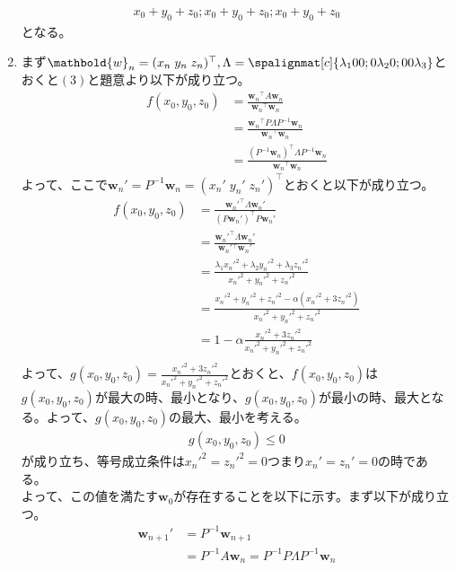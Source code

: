 \documentclass[dvipdfmx,titlepage, 11pt, a4paper]{jsarticle}%
\begin{document}
\begin{enumerate}[(1)]
\begin{align*}
{					{x_0 + y_0 + z_0};
					{x_0 + y_0 + z_0};
					{x_0 + y_0 + z_0}
				}
			\end{align*}
			となる。
	\item まず$\mathbold{w}_n = (x_n\;y_n\; z_n)^{\top}, \Lambda = \spalignmat[c]{
		{\lambda_1} {0} {0};
		{0} {\lambda_2} {0};
		{0} {0} {\lambda_3}
		}$とおくと$(3)$と題意より以下が成り立つ。
		\begin{align*}
			f(x_0, y_0, z_0) &= \frac{\mathbold{w}_n{}^{\top} A \mathbold{w}_n}{\mathbold{w}_n{}^{\top}\mathbold{w}_n}\\
			&= \frac{\mathbold{w}_n{}^{\top} P \Lambda P^{-1} \mathbold{w}_n}{\mathbold{w}_n{}^{\top}\mathbold{w}_n}\\
			&= \frac{\left(P^{-1}\mathbold{w}_n\right)^{\top} \Lambda P^{-1} \mathbold{w}_n}{\mathbold{w}_n{}^{\top}\mathbold{w}_n}
		\end{align*}
		よって、ここで$\mathbold{w}_n' = P^{-1}\mathbold{w}_n = (x_n'\;y_n'\; z_n')^{\top}$とおくと以下が成り立つ。
		\begin{align*}
			f(x_0, y_0, z_0) &= \frac{\mathbold{w}_n'^{\top} \Lambda \mathbold{w}_n'}{\left(P\mathbold{w}_n'\right)^{\top}P\mathbold{w}_n'}\\
			&= \frac{\mathbold{w}_n'^{\top} \Lambda \mathbold{w}_n'}{\mathbold{w}_n'{}^{\top}\mathbold{w}_n'}\\
			&= \frac{\lambda_1 x_n'^2 + \lambda_2 y_n'^2 + \lambda_3 z_n'^2}{x_n'^2 + y_n'^2 + z_n'^2}\\
			&= \frac{x_n'^2 + y_n'^2 + z_n'^2 - \alpha(x_n'^2 + 3z_n'^2)}{x_n'^2 + y_n'^2 + z_n'^2}\\
			&= 1 - \alpha\frac{x_n'^2 + 3z_n'^2}{x_n'^2 + y_n'^2 + z_n'^2}\\
		\end{align*}
		よって、$g(x_0, y_0, z_0) = \frac{x_n'^2 + 3z_n'^2}{x_n'^2 + y_n'^2 + z_n'^2}$とおくと、$f(x_0, y_0, z_0)$は
		$g(x_0, y_0, z_0)$が最大の時、最小となり、$g(x_0, y_0, z_0)$が最小の時、最大となる。よって、$g(x_0, y_0, z_0)$の最大、最小を考える。
		\begin{align*}
			g(x_0, y_0, z_0) \leq 0
		\end{align*}
		が成り立ち、等号成立条件は$x_n'^2 = z_n'^2 = 0$つまり$x_n' = z_n' = 0$の時である。\\
		よって、この値を満たす$\mathbold{w}_0$が存在することを以下に示す。まず以下が成り立つ。
		\begin{align*}
			\mathbold{w}_{n + 1}' &= P^{-1}\mathbold{w}_{n + 1}\\
			&= P^{-1}A\mathbold{w}_n = P^{-1}P\Lambda P^{-1}\mathbold{w}_n\\

\end{align*}
\end{enumerate}
\end{document}
